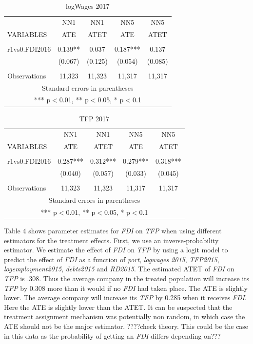 \documentclass[a4paper,11pt]{scrartcl}
\begin{document}
\begin{table}[htbp]\centering
\caption{logWages 2017}
\begin{tabular}{lcccc} \hline
 & NN1 & NN1 & NN5 & NN5 \\
VARIABLES & ATE & ATET & ATE & ATET\\ \hline
 &  &  &  &  \\
r1vs0.FDI2016 & 0.139** & 0.037 & 0.187*** & 0.137 \\
 & (0.067) & (0.125) & (0.054) & (0.085) \\
 &  &  &  &  \\
 Observations & 11,323 & 11,323 & 11,317 & 11,317 \\ \hline
\multicolumn{5}{c}{ Standard errors in parentheses} \\
\multicolumn{5}{c}{ *** p$<$0.01, ** p$<$0.05, * p$<$0.1} \\
\end{tabular}
\end{table}

\begin{table}[htbp]\centering
\caption{TFP 2017}
\begin{tabular}{lcccc} \hline
 & NN1 & NN1 & NN5 & NN5 \\
VARIABLES & ATE & ATET & ATE & ATET \\ \hline
 &  &  &  &  \\
r1vs0.FDI2016 & 0.287*** & 0.312*** & 0.279*** & 0.318*** \\
 & (0.040) & (0.057) & (0.033) & (0.045) \\
 &  &  &  &  \\
 Observations & 11,323 & 11,323 & 11,317 & 11,317 \\ \hline
\multicolumn{5}{c}{ Standard errors in parentheses} \\
\multicolumn{5}{c}{ *** p$<$0.01, ** p$<$0.05, * p$<$0.1} \\
\end{tabular}
\end{table}

\newpage
Table 4 shows parameter estimates for \textit{FDI}  on  \textit{TFP} when using different  estimators for the treatment effects. First, we use an inverse-probability estimator. We estimate the effect of \textit{FDI}  on \textit{TFP} by using a logit model to predict the effect of \textit{FDI} as a function of \textit{port}, \textit{logwages 2015}, \textit{TFP2015}, \textit{logemployment2015}, \textit{debts2015} and \textit{RD2015}. The estimated ATET of \textit{FDI}  on \textit{TFP} is .308. Thus the average company in the treated population will increase its \textit{TFP} by 0.308  more than it would if no \textit{FDI}  had taken place. The ATE is slightly lower. The average company will increase its \textit{TFP} by 0.285 when it receives \textit{FDI}. Here the ATE is slightly lower than the ATET. It can be suspected that the treatment assignment mechanism was potentially non random, in which case the ATE should not be the major estimator. ????check theory. This could be the case in this data as the probability of getting an \textit{FDI}  differs depending on???
\end{document}
